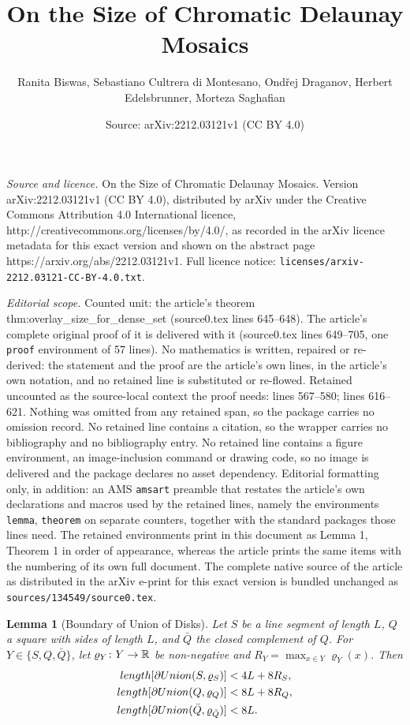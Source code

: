 \documentclass[10pt,a4paper]{amsart}
\title{On the Size of Chromatic Delaunay Mosaics}
\author{Ranita Biswas, Sebastiano Cultrera di Montesano, Ond\v{r}ej Draganov, Herbert Edelsbrunner, Morteza Saghafian}
\date{Source: arXiv:2212.03121v1 (CC BY 4.0)}
\newtheorem{lemma}{Lemma}
\newcommand{\Rspace}        {\mm{{\mathbb R}}}
\newcommand{\Union}[2]      {\mm{\rm Union}{({#1},{#2})}}
\newcommand{\length}[1]     {\mm{\rm length}{[{#1}]}}
\newcommand {\mm}[1]   {\ifmmode{#1}\else{\mbox{\(#1\)}}\fi}
\begin{document}
\maketitle

\noindent\emph{Source and licence.} On the Size of Chromatic Delaunay Mosaics. Version arXiv:2212.03121v1 (CC BY 4.0), distributed by arXiv under the Creative Commons Attribution 4.0 International licence, http://creativecommons.org/licenses/by/4.0/, as recorded in the arXiv licence metadata for this exact version and shown on the abstract page https://arxiv.org/abs/2212.03121v1. Full licence notice: \texttt{licenses/arxiv-2212.03121-CC-BY-4.0.txt}.\par\smallskip

\noindent\textit{Editorial scope.} Counted unit: the article's theorem thm:overlay\_size\_for\_dense\_set (source0.tex lines 645--648). The article's complete original proof of it is delivered with it (source0.tex lines 649--705, one \texttt{proof} environment of 57 lines). No mathematics is written, repaired or re-derived: the statement and the proof are the article's own lines, in the article's own notation, and no retained line is substituted or re-flowed.  Retained uncounted as the source-local context the proof needs: lines 567--580; lines 616--621.  Nothing was omitted from any retained span, so the package carries no omission record.  No retained line contains a citation, so the wrapper carries no bibliography and no bibliography entry.  No retained line contains a figure environment, an image-inclusion command or drawing code, so no image is delivered and the package declares no asset dependency.  Editorial formatting only, in addition: an AMS \texttt{amsart} preamble that restates the article's own declarations and macros used by the retained lines, namely the environments \texttt{lemma}, \texttt{theorem} on separate counters, together with the standard packages those lines need.  The retained environments print in this document as Lemma 1, Theorem 1 in order of appearance, whereas the article prints the same items with the numbering of its own full document.  The complete native source of the article as distributed in the arXiv e-print for this exact version is bundled unchanged as \texttt{sources/134549/source0.tex}.
\begin{lemma}[Boundary of Union of Disks]
  \label{lem:boundary_of_union_of_disks}
  Let $S$ be a line segment of length $L$, $Q$ a square with sides of length $L$, and $\bar{Q}$ the closed complement of $Q$.
  For $Y \in \{S, Q, \bar{Q} \}$, let $\varrho_Y \colon Y \to \Rspace$ be non-negative and $R_Y = \max_{x \in Y} \varrho_Y (x)$.
  Then 
  \begin{align}
    \length{\partial \Union{S}{\varrho_S}} &< 4L+8R_S, 
      \label{eqn:lengthS} \\ 
    \length{\partial \Union{Q}{\varrho_Q}} &< 8L+8R_Q,
      \label{eqn:lengthQ} \\ 
    \length{\partial \Union{\bar{Q}}{\varrho_{\bar{Q}}}} &< 8L.
      \label{eqn:lengthbarQ}
  \end{align}
\end{lemma}
\end{document}
